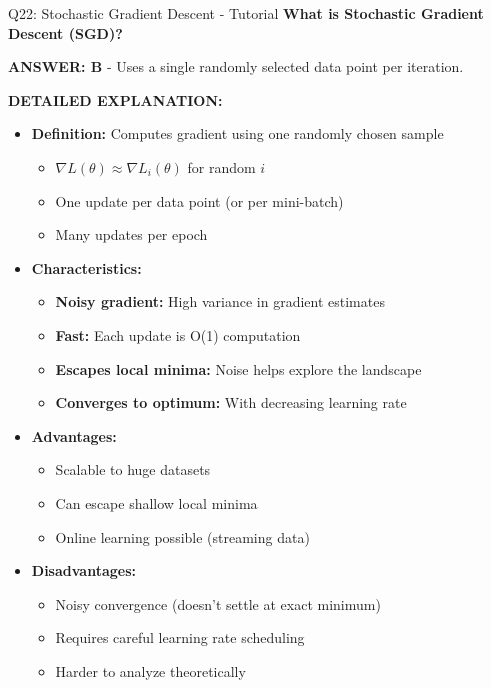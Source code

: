 \documentclass[8pt]{beamer}
\begin{document}
	\begin{frame}{Q22: Stochastic Gradient Descent - Tutorial}
		\fontsize{6.5}{7.5}\selectfont
		\textbf{What is Stochastic Gradient Descent (SGD)?}
		
		\vspace{0.05cm}
		\textcolor{myblue}{\textbf{ANSWER: B}} - Uses a single randomly selected data point per iteration.
		
		\vspace{0.05cm}
		\textbf{DETAILED EXPLANATION:}
		\begin{itemize}
			\item \textbf{Definition:} Computes gradient using one randomly chosen sample
			\begin{itemize}
				\item $\nabla L(\theta) \approx \nabla L_i(\theta)$ for random $i$
				\item One update per data point (or per mini-batch)
				\item Many updates per epoch
			\end{itemize}
			\item \textbf{Characteristics:}
			\begin{itemize}
				\item \textbf{Noisy gradient:} High variance in gradient estimates
				\item \textbf{Fast:} Each update is O(1) computation
				\item \textbf{Escapes local minima:} Noise helps explore the landscape
				\item \textbf{Converges to optimum:} With decreasing learning rate
			\end{itemize}
			\item \textbf{Advantages:}
			\begin{itemize}
				\item Scalable to huge datasets
				\item Can escape shallow local minima
				\item Online learning possible (streaming data)
			\end{itemize}
			\item \textbf{Disadvantages:}
			\begin{itemize}
				\item Noisy convergence (doesn't settle at exact minimum)
				\item Requires careful learning rate scheduling
				\item Harder to analyze theoretically
			\end{itemize}
		\end{itemize}
		

\end{frame}
\end{document}
